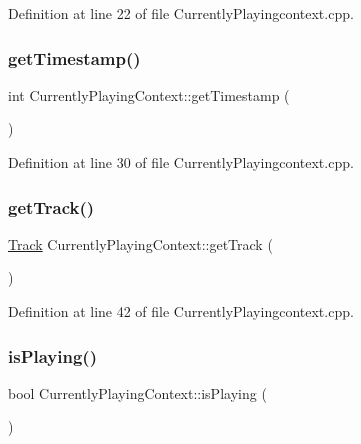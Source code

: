 Definition at line 22 of file Currently\+Playingcontext.\+cpp.

\mbox{\label{class_currently_playing_context_aa3c0456d0164495b2ba7f89bb9c6f57a}} 
\subsubsection{\texorpdfstring{get\+Timestamp()}{getTimestamp()}}
{\footnotesize\ttfamily int Currently\+Playing\+Context\+::get\+Timestamp (\begin{DoxyParamCaption}{ }\end{DoxyParamCaption})}



Definition at line 30 of file Currently\+Playingcontext.\+cpp.

\mbox{\label{class_currently_playing_context_ab2ee22004530d8e5d37aef083694f3c8}} 
\subsubsection{\texorpdfstring{get\+Track()}{getTrack()}}
{\footnotesize\ttfamily \mbox{\hyperlink{class_track}{Track}} Currently\+Playing\+Context\+::get\+Track (\begin{DoxyParamCaption}{ }\end{DoxyParamCaption})}



Definition at line 42 of file Currently\+Playingcontext.\+cpp.

\mbox{\label{class_currently_playing_context_a54ac2c6e99e0f7a435a5bc726e4818b3}} 
\subsubsection{\texorpdfstring{is\+Playing()}{isPlaying()}}
{\footnotesize\ttfamily bool Currently\+Playing\+Context\+::is\+Playing (\begin{DoxyParamCaption}{ }\end{DoxyParamCaption})}



